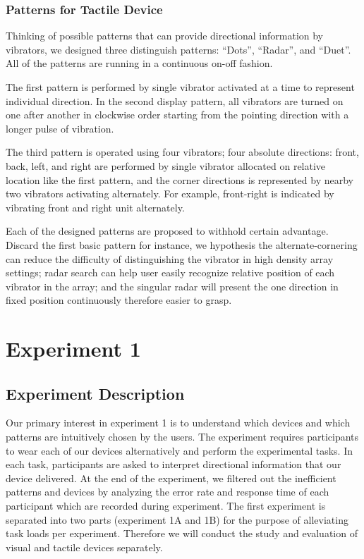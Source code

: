 \documentclass{sigchi}
\begin{document}
\subsubsection{Patterns for Tactile Device}
Thinking of possible patterns that can provide directional information by vibrators, we designed three distinguish patterns: \textquotedblleft Dots\textquotedblright, \textquotedblleft Radar\textquotedblright, and \textquotedblleft Duet\textquotedblright.
All of the patterns are running in a continuous on-off fashion.

The first pattern is performed by single vibrator activated at a time to represent individual direction. In the second display pattern, all vibrators are turned on one after another in clockwise order starting from the pointing direction with a longer pulse of vibration. 

The third pattern is operated using four vibrators; four absolute directions: front, back, left, and right are performed by single vibrator allocated on relative location like the first pattern, and the corner directions is represented by nearby two vibrators activating alternately. For example, front-right is indicated by vibrating front and right unit alternately.

Each of the designed patterns are proposed to withhold certain advantage. Discard the first basic pattern for instance, we hypothesis the alternate-cornering can reduce the difficulty of distinguishing the vibrator in high density array settings; radar search can help user easily recognize relative position of each vibrator in the array; and the singular radar will present the one direction in fixed position continuously therefore easier to grasp.

\section{Experiment 1}
\subsection{Experiment Description}
Our primary interest in experiment 1 is to understand which devices and which patterns are intuitively chosen by the users. The experiment requires participants to wear each of our devices alternatively and perform the experimental tasks. In each task, participants are asked to interpret directional information that our device delivered. At the end of the experiment, we filtered out the inefficient patterns and devices by analyzing the error rate and response time of each participant which are recorded during experiment. The first experiment is separated into two parts (experiment 1A and 1B) for the purpose of alleviating task loads per experiment. Therefore we will conduct the study and evaluation of visual and tactile devices separately.
\end{document}
